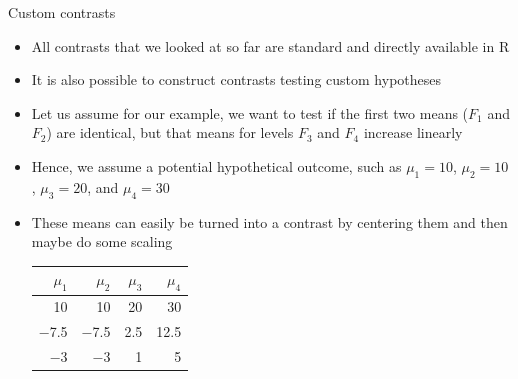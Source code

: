 \documentclass[aspectratio=169]{beamer}
\begin{document}
\begin{frame}[<+->]{Custom contrasts}
  \begin{itemize}
    \item All contrasts that we looked at so far are standard and directly
      available in R
    \item It is also possible to construct contrasts testing custom hypotheses
    \item Let us assume for our example, we want to test if the first two
      means ($F_1$ and $F_2$) are identical, but that means for levels $F_3$ and
      $F_4$ increase linearly
    \item Hence, we assume a potential hypothetical outcome, such as $\mu_1 =
      10$, $\mu_2 = 10$, $\mu_3 = 20$, and $\mu_4 = 30$
    \item These means can easily be turned into a contrast by centering them
      and then maybe do some scaling
  \begin{center}
    \begin{tabular}{rrrr}
      \hline
      $\mu_1$ & $\mu_2$ & $\mu_3$ & $\mu_4$ \\
      \hline
      10      & 10      & 20      & 30      \\
      $-$7.5  & $-$7.5  & 2.5     & 12.5    \\
      $-$3    & $-$3    & 1       & 5       \\
      \hline
     \end{tabular}
  \end{center}
  \end{itemize}
\end{frame}
\end{document}
